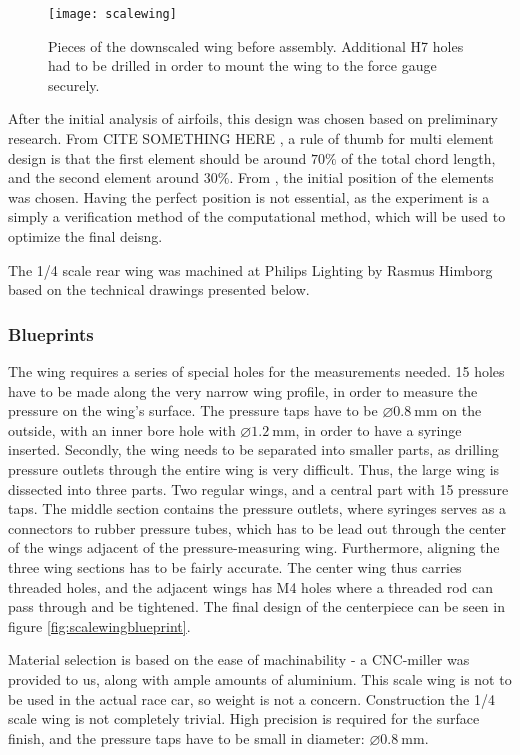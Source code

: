    \begin{figure}
      \texttt{[image: scalewing]}
      \caption{Pieces of the downscaled wing before assembly. Additional H7 holes had to be drilled in order to mount the wing to the force gauge securely.}
      \label{fig:scalewingparts}
    \end{figure}

    After the initial analysis of airfoils, this design was chosen based on preliminary research. From CITE SOMETHING HERE  , a rule of thumb for multi element design is that the first element should be around $70\%$ of the total chord length, and the second element around $30\%$. From \cite{jkatz}, the initial position of the elements was chosen. Having the perfect position is not essential, as the experiment is a simply a verification method of the computational method, which will be used to optimize the final deisng.

    The 1/4 scale rear wing was machined at Philips Lighting by Rasmus Himborg based on the technical drawings presented below.

    \subsubsection{Blueprints}

      The wing requires a series of special holes for the measurements needed. 15 holes have to be made along the very narrow wing profile, in order to measure the pressure on the wing's surface. The pressure taps have to be $\diameter\SI{0.8}{\milli\metre}$ on the outside, with an inner bore hole with $\diameter\SI{1.2}{\milli\metre}$, in order to have a syringe inserted. Secondly, the wing needs to be separated into smaller parts, as drilling pressure outlets through the entire wing is very difficult. Thus, the large wing is dissected into three parts. Two regular wings, and a central part with 15 pressure taps. The middle section contains the pressure outlets, where syringes serves as a connectors to rubber pressure tubes, which has to be lead out through the center of the wings adjacent of the pressure-measuring wing. Furthermore, aligning the three wing sections has to be fairly accurate. The center wing thus carries threaded holes, and the adjacent wings has M4 holes where a threaded rod can pass through and be tightened. The final design of the centerpiece can be seen in figure \ref{fig:scalewingblueprint}.

      Material selection is based on the ease of machinability - a CNC-miller was provided to us, along with ample amounts of aluminium. This scale wing is not to be used in the actual race car, so weight is not a concern. Construction the 1/4 scale wing is not completely trivial. High precision is required for the surface finish, and the pressure taps have to be small in diameter: $\diameter\SI{0.8}{\milli\metre}$.


